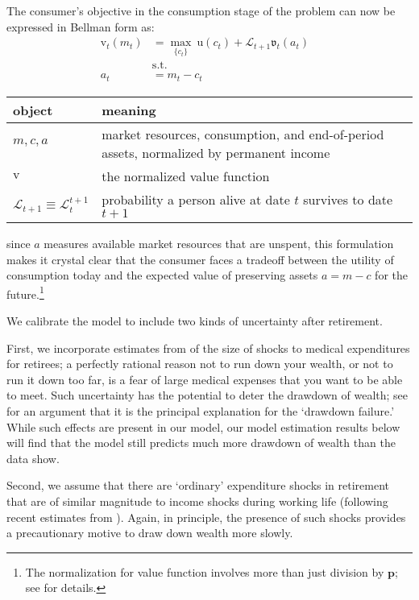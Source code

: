 \documentclass{article}
\newcommand{\uFunc}{\mathrm{u}}
\newcommand{\pLvl}{\mathbf{p}}
\newcommand{\vFunc}{\mathrm{v}}
\newcommand{\Alive}{\mathcal{L}}
\newcommand{\tranShkEmp}{\xi}
\newcommand{\cNrm}{c}
\newcommand{\RNrm}{\mathcal{R}}
\newcommand{\aNrm}{a}
\newcommand{\mNrm}{m}
\begin{document}
The consumer's objective in the consumption stage of the problem can now be expressed in Bellman form as:
\begin{align}
    {\vFunc}_{t}({\mNrm}_{t}) & = \max_{\{\cNrm_{t}\}} ~ \uFunc(\cNrm_{t})+\Alive_{t+1} \mathfrak{v}_{t}(\aNrm_{t})
    \\ & \text{s.t.} &
    \\ \aNrm_{t} & = {\mNrm}_{t}-\cNrm_{t}
\end{align}

\bigskip\noindent
\begin{tabular}{p{}p{}}
\toprule
object & meaning \\
\hline
$\mNrm, \cNrm, \aNrm$ & market resources, consumption, and end-of-period assets, normalized by permanent income \\
$\vFunc$ & the normalized value function \\
$\Alive_{t+1} \equiv \Alive_{t}^{t+1}$ & probability a person alive at date $t$ survives to date $t+1$ \\
\bottomrule
\end{tabular}

\bigskipand since $\aNrm$ measures available market resources that are unspent, this formulation makes it crystal clear that the consumer faces a tradeoff between the utility of consumption today and the expected value of preserving assets $\aNrm=\mNrm -\cNrm$ for the future.\footnote{The normalization for value function involves more than just division by $\pLvl$; see \cite{BufferStockTheory} for details.}

We calibrate the model to include two kinds of uncertainty after retirement.

First, we incorporate estimates from \cite{Cagetti2003} of the size of shocks to medical expenditures for retirees; a perfectly rational reason not to run down your wealth, or not to run it down too far, is a fear of large medical expenses that you want to be able to meet.  Such uncertainty has the potential to deter the drawdown of wealth; see \cite{Ameriks2020jpe} for an argument that it is the principal explanation for the `drawdown failure.'  While such effects are present in our model, our model estimation results below will find that the model still predicts much more drawdown of wealth than the data show.

Second, we assume that there are `ordinary' expenditure shocks in retirement that are of similar magnitude to income shocks during working life (following recent estimates from  \cite{flExpShocks}).  Again, in principle, the presence of such shocks provides a precautionary motive to draw down wealth more slowly.
\end{document}
